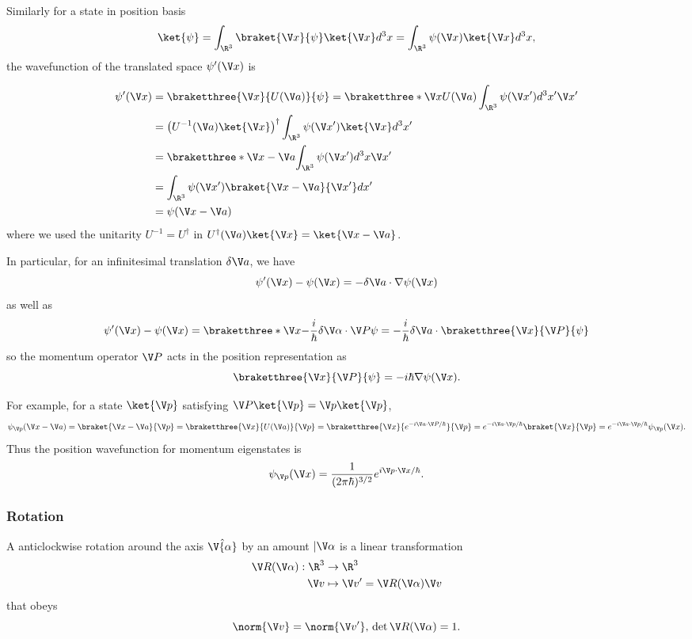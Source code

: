 \documentclass[a4paper]{article}
\newcommand*{\bk}{\braket}
\newcommand*{\bkt}{\braketthree}
\theoremstyle{definition}
\begin{document}
Similarly for a state in position basis
\[
  \ket{\psi} = \int_{\R^3}^{ } \bk{\V x}{\psi}\ket{\V x} d^3x = \int_{\R^3}^{ } \psi(\V x)\ket{\V x} d^3x,
\]
the wavefunction of the translated space \(\psi'(\V x)\) is

\begin{align*}
  \psi'(\V x) &= \bkt{\V x}{U(\V a)}{\psi} = \bkt*{\V x}{U(\V a) \int_{\R^3}^{} \psi(\V x') d^3x'}{\V x'} \\
              &= \big(U^{-1}(\V a)\ket{\V x} \big)^\dag \int_{\R^3}^{ } \psi(\V x') \ket{\V x} d^3 x' \\
              &= \bkt*{\V x- \V a}{\int_{\R^3}^{ } \psi(\V x') d^3x}{\V x'} \\
              &= \int_{\R^3}^{ } \psi(\V x')\bk{\V x - \V a}{\V x'} dx' \\
              &= \psi(\V x- \V a)
\end{align*}
where we used the unitarity \(U^{-1} = U^\dag\) in \(U^\dag(\V a)\ket{\V x} = \ket{\V x- \V a}\).

In particular, for an infinitesimal translation \(\delta\V a\), we have
\[
  \psi'(\V x) - \psi(\V x) = -\delta\V a\cdot \nabla \psi(\V x)
\]
as well as
\[
  \psi'(\V x) - \psi(\V x) = \bkt*{\V x}{-\frac{i}{\hbar}\delta\V \alpha\cdot \V P}{\psi} = -\frac{i}{\hbar}\delta\V a\cdot \bkt{\V x}{\V P}{\psi}
\]
so the momentum operator \(\V P\) acts in the position representation as
\[
  \bkt{\V x}{\V P}{\psi} = -i\hbar\nabla\psi(\V x).
\]

For example, for a state \(\ket{\V p}\) satisfying \(\V P \ket{\V p} = \V p \ket{\V p}\),
\[
  \psi_{\V p}(\V x- \V a) = \bk{\V x- \V a}{\V p} = \bkt{\V x}{U(\V a)}{\V p} = \bkt{\V x}{e^{-i\V a\cdot\V P/\hbar}}{\V p} =  e^{-i\V a\cdot \V p/\hbar}\bk{\V x}{\V p} = e^{-i\V a\cdot \V p/\hbar}\psi_{\V p}(\V x).
\]
Thus the position wavefunction for momentum eigenstates is
\[
  \psi_{\V p}(\V x) = \frac{1}{(2\pi \hbar)^{3/2}} e^{i\V p\cdot \V x/\hbar}.
\]

\subsubsection{Rotation}

A anticlockwise rotation around the axis \(\hat \V{\alpha}\) by an amount \(|\V \alpha\) is a linear transformation
\begin{align*}
  \V R(\V \alpha): \R^3 &\to \R^3 \\
  \V v &\mapsto \V v' = \V R(\V \alpha)\V v
\end{align*}
that obeys
\[
  \norm{\V v} = \norm{\V v'}, \, \det{\V R(\V \alpha)} = 1.
\]
\end{document}
